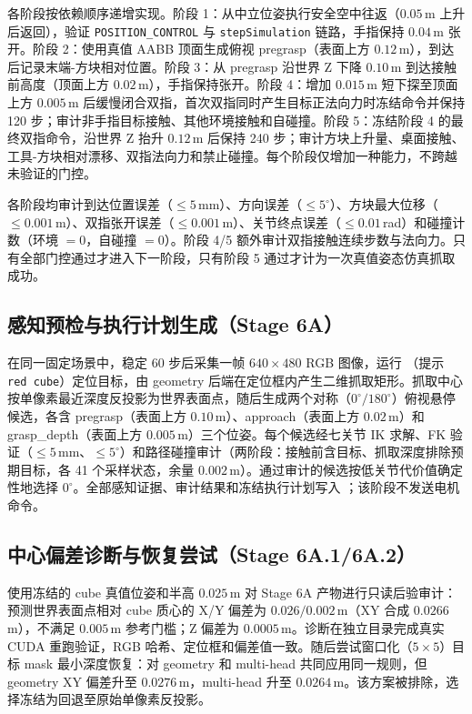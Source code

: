 \documentclass{l4proj}
\begin{document}
各阶段按依赖顺序递增实现。阶段 1：从中立位姿执行安全空中往返（$0.05$\,m 上升后返回），验证 \texttt{POSITION\_CONTROL} 与 \texttt{stepSimulation} 链路，手指保持 $0.04$\,m 张开。阶段 2：使用真值 AABB 顶面生成俯视 pregrasp（表面上方 $0.12$\,m），到达后记录末端-方块相对位置。阶段 3：从 pregrasp 沿世界 Z 下降 $0.10$\,m 到达接触前高度（顶面上方 $0.02$\,m），手指保持张开。阶段 4：增加 $0.015$\,m 短下探至顶面上方 $0.005$\,m 后缓慢闭合双指，首次双指同时产生目标正法向力时冻结命令并保持 120 步；审计非手指目标接触、其他环境接触和自碰撞。阶段 5：冻结阶段 4 的最终双指命令，沿世界 Z 抬升 $0.12$\,m 后保持 240 步；审计方块上升量、桌面接触、工具-方块相对漂移、双指法向力和禁止碰撞。每个阶段仅增加一种能力，不跨越未验证的门控。

各阶段均审计到达位置误差（$\leq 5$\,mm）、方向误差（$\leq 5^\circ$）、方块最大位移（$\leq 0.001$\,m）、双指张开误差（$\leq 0.001$\,m）、关节终点误差（$\leq 0.01$\,rad）和碰撞计数（环境 $=0$，自碰撞 $=0$）。阶段 4/5 额外审计双指接触连续步数与法向力。只有全部门控通过才进入下一阶段，只有阶段 5 通过才计为一次真值姿态仿真抓取成功。

\subsection{感知预检与执行计划生成（Stage 6A）}
在同一固定场景中，稳定 60 步后采集一帧 $640\times480$ RGB 图像，运行 （提示 \texttt{red cube}）定位目标，由 geometry 后端在定位框内产生二维抓取矩形。抓取中心按单像素最近深度反投影为世界表面点，随后生成两个对称（$0^\circ/180^\circ$）俯视悬停候选，各含 pregrasp（表面上方 $0.10$\,m）、approach（表面上方 $0.02$\,m）和 grasp\_depth（表面上方 $0.005$\,m）三个位姿。每个候选经七关节 IK 求解、FK 验证（$\leq 5$\,mm、$\leq 5^\circ$）和路径碰撞审计（两阶段：接触前含目标、抓取深度排除预期目标，各 41 个采样状态，余量 $0.002$\,m）。通过审计的候选按低关节代价值确定性地选择 $0^\circ$。全部感知证据、审计结果和冻结执行计划写入 ；该阶段不发送电机命令。

\subsection{中心偏差诊断与恢复尝试（Stage 6A.1/6A.2）}
使用冻结的 cube 真值位姿和半高 $0.025$\,m 对 Stage 6A 产物进行只读后验审计：预测世界表面点相对 cube 质心的 X/Y 偏差为 $0.026/0.002$\,m（XY 合成 $0.0266$\,m），不满足 $0.005$\,m 参考门槛；Z 偏差为 $0.0005$\,m。诊断在独立目录完成真实 CUDA 重跑验证，RGB 哈希、定位框和偏差值一致。随后尝试窗口化（$5\times5$）目标 mask 最小深度恢复：对 geometry 和 multi-head 共同应用同一规则，但 geometry XY 偏差升至 $0.0276$\,m，multi-head 升至 $0.0264$\,m。该方案被排除，选择冻结为回退至原始单像素反投影。
\end{document}
